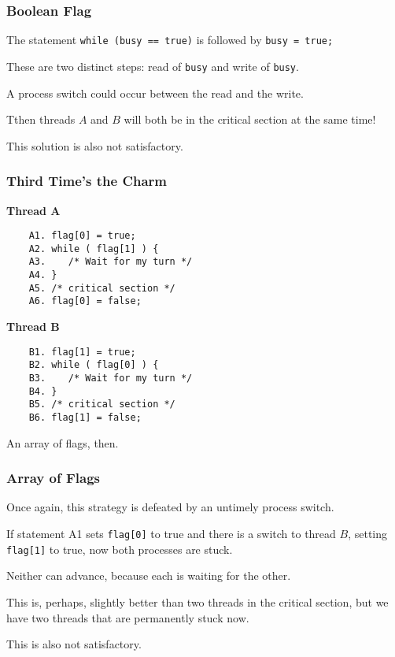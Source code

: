 \begin{frame}
\frametitle{Boolean Flag}

The statement \texttt{while (busy == true)} is followed by \texttt{busy = true;} 

These are two distinct steps: read of \texttt{busy} and write of \texttt{busy}.

A process switch could occur between the read and the write.

Tthen threads $A$ and $B$ will both be in the critical section at the same time! 

This solution is also not satisfactory.

\end{frame}

\begin{frame}[fragile]
\frametitle{Third Time's the Charm}

\begin{multicols}{2}
\textbf{Thread A}
	\begin{verbatim}
	A1. flag[0] = true;
	A2. while ( flag[1] ) {
	A3.    /* Wait for my turn */
	A4. }
	A5. /* critical section */
	A6. flag[0] = false;
	\end{verbatim}
\columnbreak
\textbf{Thread B}
	\begin{verbatim}
	B1. flag[1] = true;
	B2. while ( flag[0] ) {
	B3.    /* Wait for my turn */
	B4. }
	B5. /* critical section */
	B6. flag[1] = false;
	\end{verbatim}
\end{multicols}

An array of flags, then.
\end{frame}

\begin{frame}
\frametitle{Array of Flags}

Once again, this strategy is defeated by an untimely process switch. 

If statement A1 sets \texttt{flag[0]} to true and there is a switch to thread $B$, setting \texttt{flag[1]} to true, now both processes are stuck.

Neither can advance, because each is waiting for the other.

This is, perhaps, slightly better than two threads in the critical section, but we have two threads that are permanently stuck now. 

This is also not satisfactory.

\end{frame}


